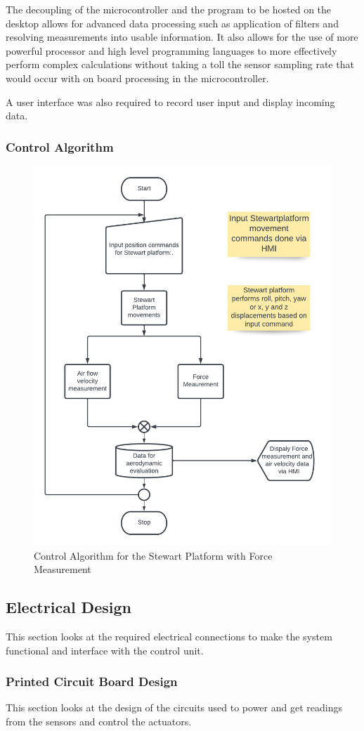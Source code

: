 The decoupling of the microcontroller and the program to be hosted on the desktop allows for advanced data processing such as application of filters and resolving measurements into usable information. It also allows for the use of more powerful processor and high level programming languages to more effectively perform complex calculations without taking a toll the sensor sampling rate that would occur with on board processing in the microcontroller.

A user interface was also required to record user input and display incoming data.
\subsubsection{Control Algorithm}
\begin{center}
	\begin{figure}[H]
	\centering
	\includegraphics[width=0.7\linewidth]{Figures/Flow}
	\caption[Control Algorithm]{Control Algorithm for the Stewart Platform with Force Measurement}
	\end{figure}
\end{center}
\subsection{Electrical Design}
This section looks at the required electrical connections to make the system functional and interface with the control unit.
\subsubsection{Printed Circuit Board Design}
This section looks at the design of the circuits used to power and get readings from the sensors and control the actuators.

